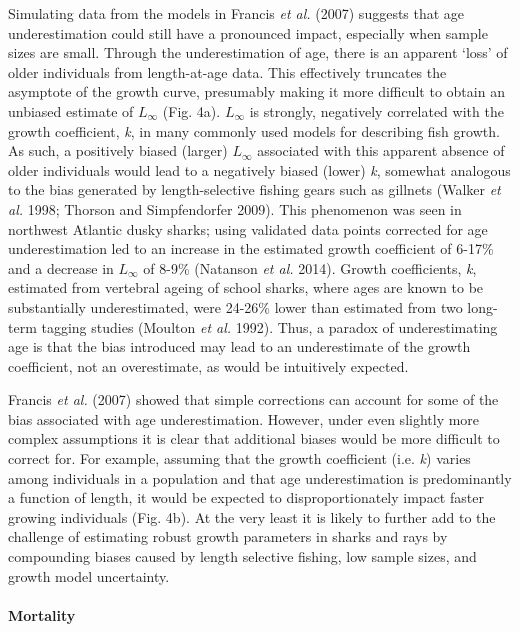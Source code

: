 \documentclass[]{article}
\let\oldparagraph\paragraph
\renewcommand{\paragraph}[1]{\oldparagraph{#1}\mbox{}}
\begin{document}
Simulating data from the models in Francis \emph{et al.} (2007) suggests
that age underestimation could still have a pronounced impact,
especially when sample sizes are small. Through the underestimation of
age, there is an apparent `loss' of older individuals from length-at-age
data. This effectively truncates the asymptote of the growth curve,
presumably making it more difficult to obtain an unbiased estimate of
\(L_\infty\) (Fig. 4a). \(L_\infty\) is strongly, negatively correlated
with the growth coefficient, \emph{k}, in many commonly used models for
describing fish growth. As such, a positively biased (larger)
\(L_\infty\) associated with this apparent absence of older individuals
would lead to a negatively biased (lower) \emph{k}, somewhat analogous
to the bias generated by length-selective fishing gears such as gillnets
(Walker \emph{et al.} 1998; Thorson and Simpfendorfer 2009). This
phenomenon was seen in northwest Atlantic dusky sharks; using validated
data points corrected for age underestimation led to an increase in the
estimated growth coefficient of 6-17\% and a decrease in \(L_\infty\) of
8-9\% (Natanson \emph{et al.} 2014). Growth coefficients, \emph{k},
estimated from vertebral ageing of school sharks, where ages are known
to be substantially underestimated, were 24-26\% lower than estimated
from two long-term tagging studies (Moulton \emph{et al.} 1992). Thus, a
paradox of underestimating age is that the bias introduced may lead to
an underestimate of the growth coefficient, not an overestimate, as
would be intuitively expected.

Francis \emph{et al.} (2007) showed that simple corrections can account
for some of the bias associated with age underestimation. However, under
even slightly more complex assumptions it is clear that additional
biases would be more difficult to correct for. For example, assuming
that the growth coefficient (i.e. \emph{k}) varies among individuals in
a population and that age underestimation is predominantly a function of
length, it would be expected to disproportionately impact faster growing
individuals (Fig. 4b). At the very least it is likely to further add to
the challenge of estimating robust growth parameters in sharks and rays
by compounding biases caused by length selective fishing, low sample
sizes, and growth model uncertainty.

\paragraph{Mortality}\label{mortality}
\end{document}
